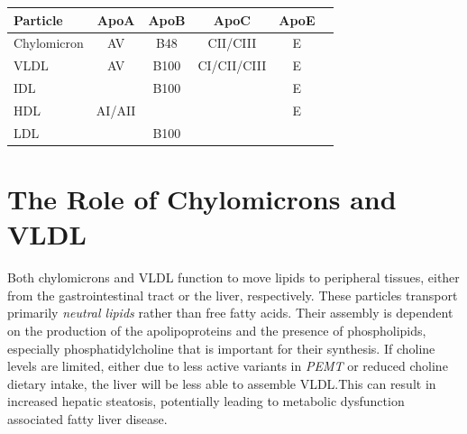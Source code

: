 \documentclass{tufte-handout}
\begin{document}
\begin{margintable}
\centering
\caption{Apolipoprotein summary.  Some key things to remember, ApoB48 is specifically made in the enterocyte.  ApoB100 and ApoE are the ligands for the LDL Receptor allowing for LDL uptake in tissues expressing the LDL receptor (mainly the liver).  ApoCII is a coenzyme for LPL thus activating it and allowing for lipid extraction to peripheral tissues.}\label{tab:apolipoproteins}
\begin{tabular}{@{}lccccc@{}}  %
\toprule
\textbf{Particle} & \textbf{ApoA} & \textbf{ApoB} & \textbf{ApoC} & \textbf{ApoE} \\ \midrule
Chylomicron       & AV            & B48           & CII/CIII      & E             \\
VLDL              & AV            & B100          & CI/CII/CIII   & E             \\
IDL               &               & B100          &               & E             \\
HDL               & AI/AII        &               &               & E             \\
LDL               &               & B100          &               &               \\
\bottomrule
\end{tabular}
\end{margintable}


\section{The Role of Chylomicrons and VLDL}

Both chylomicrons and VLDL function to move lipids to peripheral tissues, either from the gastrointestinal tract or the liver, respectively.  These particles transport primarily \emph{neutral lipids} rather than free fatty acids.  Their assembly is dependent on the production of the apolipoproteins and the presence of phospholipids, especially phosphatidylcholine that is important for their synthesis.   If choline levels are limited, either due to less active variants in \textit{PEMT} or reduced choline dietary intake, the liver will be less able to assemble VLDL.\@  This can result in increased hepatic steatosis, potentially leading to metabolic dysfunction associated fatty liver disease.
\end{document}
